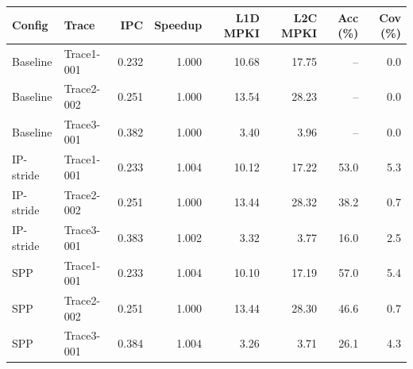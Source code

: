 \begin{tabular}{llrrrrrr}
\toprule
Config & Trace & IPC & Speedup & L1D MPKI & L2C MPKI & Acc (\%) & Cov (\%) \\
\midrule
Baseline & Trace1-001 & 0.232 & 1.000 & 10.68 & 17.75 & -- & 0.0 \\
Baseline & Trace2-002 & 0.251 & 1.000 & 13.54 & 28.23 & -- & 0.0 \\
Baseline & Trace3-001 & 0.382 & 1.000 & 3.40 & 3.96 & -- & 0.0 \\
IP-stride & Trace1-001 & 0.233 & 1.004 & 10.12 & 17.22 & 53.0 & 5.3 \\
IP-stride & Trace2-002 & 0.251 & 1.000 & 13.44 & 28.32 & 38.2 & 0.7 \\
IP-stride & Trace3-001 & 0.383 & 1.002 & 3.32 & 3.77 & 16.0 & 2.5 \\
SPP & Trace1-001 & 0.233 & 1.004 & 10.10 & 17.19 & 57.0 & 5.4 \\
SPP & Trace2-002 & 0.251 & 1.000 & 13.44 & 28.30 & 46.6 & 0.7 \\
SPP & Trace3-001 & 0.384 & 1.004 & 3.26 & 3.71 & 26.1 & 4.3 \\
\bottomrule
\end{tabular}
